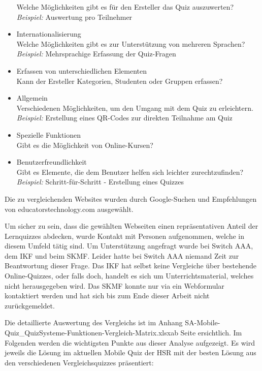 \begin{itemize}
		Welche Möglichkeiten gibt es für den Ersteller das Quiz auszuwerten? \\
		\textit{Beispiel:} Auswertung pro Teilnehmer
		\item Internationalisierung \\
		Welche Möglichkeiten gibt es zur Unterstützung von mehreren Sprachen? \\
		\textit{Beispiel:} Mehrsprachige Erfassung der Quiz-Fragen
		\item Erfassen von unterschiedlichen Elementen \\
		Kann der Ersteller Kategorien, Studenten oder Gruppen erfassen?
		\item Allgemein \\
		Verschiedenen Möglichkeiten, um den Umgang mit dem Quiz zu erleichtern. \\
		\textit{Beispiel:} Erstellung eines QR-Codes zur direkten Teilnahme am Quiz
		\item Spezielle Funktionen \\
		Gibt es die Möglichkeit von Online-Kursen?
		\item Benutzerfreundlichkeit \\
		Gibt es Elemente, die dem Benutzer helfen sich leichter zurechtzufinden? \\
		\textit{Beispiel:} Schritt-für-Schritt - Erstellung eines Quizzes
	\end{itemize}
	
	\bigskip
	
	Die zu vergleichenden Websites wurden durch Google-Suchen und Empfehlungen von educatorstechnology.com \cite{educatorstechnology.com} ausgewählt.
		
	Um sicher zu sein, dass die gewählten Webseiten einen repräsentativen Anteil der Lernquizzes abdecken, wurde Kontakt mit Personen aufgenommen, welche in diesem Umfeld tätig sind. Um Unterstützung angefragt wurde bei Switch AAA, dem \acrfull{IKF} und beim \acrfull{SKMF}.
	Leider hatte bei Switch AAA niemand Zeit zur Beantwortung dieser Frage. Das \acrshort{IKF} hat selbst keine Vergleiche über bestehende Online-Quizzes, oder falls doch, handelt es sich um Unterrichtsmaterial, welches nicht herausgegeben wird. Das \acrshort{SKMF} konnte nur via ein Webformular kontaktiert werden und hat sich bis zum Ende dieser Arbeit nicht zurückgemeldet.
	
	\bigskip
	
	Die detaillierte Auswertung des Vergleichs ist im Anhang \glqq SA-Mobile-Quiz\_QuizSysteme-Funktionen-Vergleich-Matrix.xlsx\grqq ab Seite \hyperlink{page.\getpagerefnumber{pdf:webauswertungMatrix}}{} ersichtlich. Im Folgenden werden die wichtigsten Punkte aus dieser Analyse aufgezeigt. Es wird jeweils die Lösung im aktuellen Mobile Quiz der HSR mit der besten Lösung aus den verschiedenen Vergleichsquizzes präsentiert:
	
